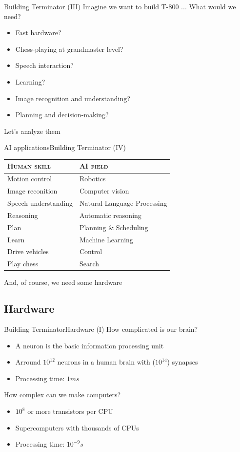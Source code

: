 \documentclass[10pt,compress]{beamer} %
\begin{document}
\begin{frame}{Building Terminator (III)}
	Imagine we want to build T-800 ... What would we need?
	\begin{itemize}
		\item Fast hardware?
		\item Chess-playing at grandmaster level?
		\item Speech interaction?
		\item Learning?
		\item Image recognition and understanding?
		\item Planning and decision-making?
	\end{itemize}
	Let's analyze them
\end{frame}

\begin{frame}{AI applications}{Building Terminator (IV)}
    \begin{table}
    \centering
    \begin{tabular}{l|l}
    \textsc{Human skill} & \textsc{AI field} \\\hline
    Motion control & Robotics \\
    Image reconition & Computer vision \\
    Speech understanding & Natural Language Processing \\
    Reasoning & Automatic reasoning \\
    Plan & Planning \& Scheduling \\
    Learn & Machine Learning \\
    Drive vehicles & Control \\
    Play chess & Search \\
    \end{tabular}
    \end{table}

    And, of course, we need some hardware
\end{frame}

\subsection{Hardware}
\begin{frame}{Building Terminator}{Hardware (I)}
	How complicated is our brain?
	\begin{itemize}
		\item A neuron is the basic information processing unit
		\item Arround $10^{12}$ neurons in a human brain with ($10^{14}$) synapses 
		\item Processing time: $1 ms$
	\end{itemize}
	How complex can we make computers?
	\begin{itemize}
		\item $10^8$ or more transistors per CPU
		\item Supercomputers with thousands of CPUs
		\item Processing time: $10^{-9}s$
	\end{itemize}
\end{frame}
\end{document}
